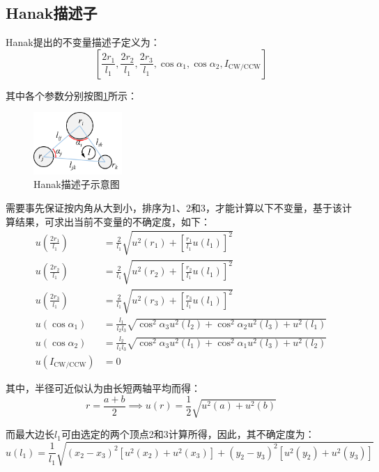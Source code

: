 \documentclass{article}
\begin{document}
\subsection{Hanak描述子}
Hanak\cite{hanakCraterIdentificationAlgorithm2010}提出的不变量描述子定义为：
\begin{equation}
  \left[\frac{2r_1}{l_1},\frac{2r_2}{l_1},\frac{2r_3}{l_1},\cos\alpha_1,\cos\alpha_2,I_\mathrm{CW/CCW}\right]
\end{equation}\par
其中各个参数分别按图\ref{fig:Hanak}所示：
\begin{figure}[H]
  \centering
  \includegraphics[width=0.3\textwidth]{Hanak三元组.png}
  \caption{Hanak描述子示意图}
  \label{fig:Hanak}
\end{figure}\par
需要事先保证按内角从大到小，排序为1、2和3，才能计算以下不变量，基于该计算结果，可求出当前不变量的不确定度，如下：
\begin{equation}
  \begin{aligned}
    u\left(\frac{2r_1}{l_1}\right)&=\frac{2}{l_1}\sqrt{u^2(r_1)+\left[\frac{r_1}{l_1}u(l_1)\right]^2}\\
    u\left(\frac{2r_2}{l_1}\right)&=\frac{2}{l_1}\sqrt{u^2(r_2)+\left[\frac{r_2}{l_1}u(l_1)\right]^2}\\
    u\left(\frac{2r_3}{l_1}\right)&=\frac{2}{l_1}\sqrt{u^2(r_3)+\left[\frac{r_3}{l_1}u(l_1)\right]^2}\\
    u(\cos\alpha_1)&=\frac{l_1}{l_2l_3}\sqrt{\cos^2\alpha_3u^2(l_2)+\cos^2\alpha_2u^2(l_3)+u^2(l_1)}\\
    u(\cos\alpha_2)&=\frac{l_2}{l_1l_3}\sqrt{\cos^2\alpha_3u^2(l_1)+\cos^2\alpha_1u^2(l_3)+u^2(l_2)}\\
    u(I_\mathrm{CW/CCW})&=0
  \end{aligned}
\end{equation}\par
其中，半径可近似认为由长短两轴平均而得：
\begin{equation*}
  r=\frac{a+b}{2}\implies u(r)=\frac{1}{2}\sqrt{u^2(a)+u^2(b)}
\end{equation*}\par
而最大边长$l_1$可由选定的两个顶点2和3计算所得，因此，其不确定度为：
\begin{equation*}
  u(l_1)=\frac{1}{l_1}\sqrt{(x_2-x_3)^2[u^2(x_2)+u^2(x_3)]+(y_2-y_3)^2[u^2(y_2)+u^2(y_3)]}
\end{equation*}\par
\end{document}
